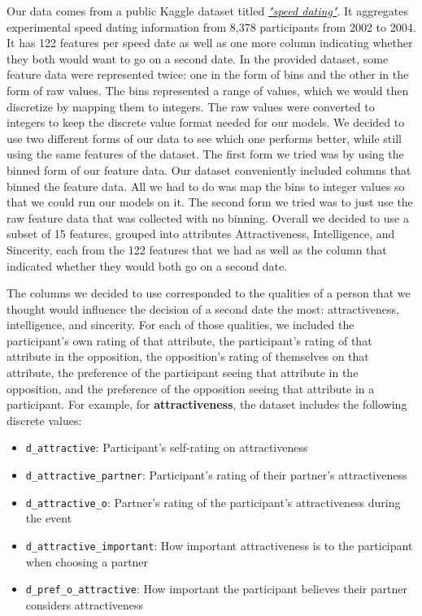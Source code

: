 \documentclass{article}
\begin{document}
Our data comes from a public Kaggle dataset titled \href{https://www.kaggle.com/datasets/polarbearyap/speed-dating}{\textit{"speed dating"}}. It aggregates experimental speed dating information from 8,378 participants from 2002 to 2004. It has 122 features per speed date as well as one more column indicating whether they both would want to go on a second date. In the provided dataset, some feature data were represented twice: one in the form of bins and the other in the form of raw values. The bins represented a range of values, which we would then discretize by mapping them to integers. The raw values were converted to integers to keep the discrete value format needed for our models. We decided to use two different forms of our data to see which one performs better, while still using the same features of the dataset. The first form we tried was by using the binned form of our feature data. Our dataset conveniently included columns that binned the feature data. All we had to do was map the bins to integer values so that we could run our models on it. The second form we tried was to just use the raw feature data that was collected with no binning. Overall we decided to use a subset of 15 features, grouped into attributes {Attractiveness, Intelligence, and Sincerity}, each from the 122 features that we had as well as the column that indicated whether they would both go on a second date.

The columns we decided to use corresponded to the qualities of a person that we thought would influence the decision of a second date the most: attractiveness, intelligence, and sincerity. For each of those qualities, we included the participant's own rating of that attribute, the participant's rating of that attribute in the opposition, the opposition's rating of themselves on that attribute, the preference of the participant seeing that attribute in the opposition, and the preference of the opposition seeing that attribute in a participant. For example, for \textbf{attractiveness}, the dataset includes the following discrete values:
\begin{itemize}
  \item \texttt{d\_attractive}: Participant's self-rating on attractiveness {}
  \item \texttt{d\_attractive\_partner}: Participant's rating of their partner's attractiveness
  \item \texttt{d\_attractive\_o}: Partner's rating of the participant's attractiveness during the event
  \item \texttt{d\_attractive\_important}: How important attractiveness is to the participant when choosing a partner
  \item \texttt{d\_pref\_o\_attractive}: How important the participant believes their partner considers attractiveness
\end{itemize}
\end{document}

